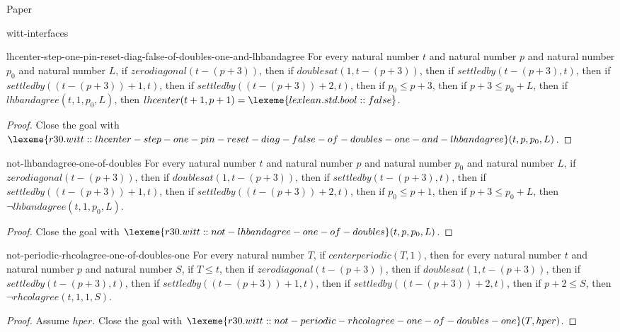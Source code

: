 \begin{lexlean}{Paper}
\begin{section}{witt-interfaces}
  \begin{theorem}{lhcenter-step-one-pin-reset-diag-false-of-doubles-one-and-lhbandagree}
  For every natural number \(t\) and natural number \(p\) and natural number \(p_0\) and natural number \(L\), if \(zerodiagonal(t - (p + 3))\), then if \(doublesat(1, t - (p + 3))\), then if \(settledby(t - (p + 3), t)\), then if \(settledby((t - (p + 3)) + 1, t)\), then if \(settledby((t - (p + 3)) + 2, t)\), then if \(p_0 ≤ p + 3\), then if \(p + 3 ≤ p_0 + L\), then if \(lhbandagree(t, 1, p_0, L)\), then \(lhcenter(t + 1, p + 1) = \lexeme{lexlean.std.bool::false}\).
  \begin{proof}
  Close the goal with \(\lexeme{r30.witt::lhcenter-step-one-pin-reset-diag-false-of-doubles-one-and-lhbandagree}(t, p, p_0, L)\).
  \end{proof}
  \end{theorem}

  \begin{theorem}{not-lhbandagree-one-of-doubles}
  For every natural number \(t\) and natural number \(p\) and natural number \(p_0\) and natural number \(L\), if \(zerodiagonal(t - (p + 3))\), then if \(doublesat(1, t - (p + 3))\), then if \(settledby(t - (p + 3), t)\), then if \(settledby((t - (p + 3)) + 1, t)\), then if \(settledby((t - (p + 3)) + 2, t)\), then if \(p_0 ≤ p + 1\), then if \(p + 3 ≤ p_0 + L\), then \(¬lhbandagree(t, 1, p_0, L)\).
  \begin{proof}
  Close the goal with \(\lexeme{r30.witt::not-lhbandagree-one-of-doubles}(t, p, p_0, L)\).
  \end{proof}
  \end{theorem}

  \begin{theorem}{not-periodic-rhcolagree-one-of-doubles-one}
  For every natural number \(T\), if \(centerperiodic(T, 1)\), then for every natural number \(t\) and natural number \(p\) and natural number \(S\), if \(T ≤ t\), then if \(zerodiagonal(t - (p + 3))\), then if \(doublesat(1, t - (p + 3))\), then if \(settledby(t - (p + 3), t)\), then if \(settledby((t - (p + 3)) + 1, t)\), then if \(settledby((t - (p + 3)) + 2, t)\), then if \(p + 2 ≤ S\), then \(¬rhcolagree(t, 1, 1, S)\).
  \begin{proof}
  Assume \(hper\).
  Close the goal with \(\lexeme{r30.witt::not-periodic-rhcolagree-one-of-doubles-one}(T, hper)\).
  \end{proof}
  \end{theorem}


\end{section}
\end{lexlean}
